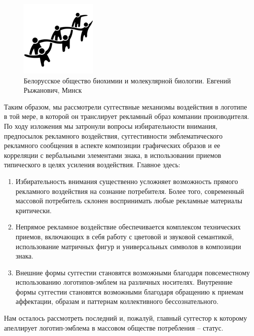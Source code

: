 \begin{figure}[h]
  \centering
  \includegraphics[width=.5\linewidth]{images/biochem}
  \caption{Белорусское общество биохимии и молекулярной биологии. Евгений Рыжанович, Минск}
  \label{fig:biochem}
\end{figure}

Таким образом, мы рассмотрели суггествные механизмы воздействия в логотипе в
той мере, в которой он транслирует рекламный образ компании производителя. По
ходу изложения мы затронули вопросы избирательности внимания, предпосылок рекламного
воздействия, суггестивности эмблематического рекламного сообщения в аспекте
композиции графических образов и ее корреляции с вербальными элементами знака,
в использовании приемов типического в целях усиления воздействия. Главное здесь:
\begin{enumerate}
\item Избирательность внимания существенно усложняет возможность прямого
  рекламного воздействия на сознание потребителя. Более того, современный
  массовой потребитель склонен воспринимать любые рекламные материалы
  критически.
\item Непрямое рекламное воздействие обеспечивается комплексом технических
  приемов, включающих в себя работу с цветовой и звуковой семантикой,
  использование матричных фигур и универсальных символов в композиции
  знака.
\item Внешние формы суггестии становятся возможными благодаря повсеместному
  использованию логотипов-эмблем на различных носителях. Внутренние формы
  суггестии становятся возможными благодаря обращению к приемам аффектации,
  образам и паттернам коллективного бессознательного.
\end{enumerate}

Нам осталось рассмотреть последний и, пожалуй, главный суггестор к которому
апеллирует логотип-эмблема в массовом обществе потребления -- статус.

